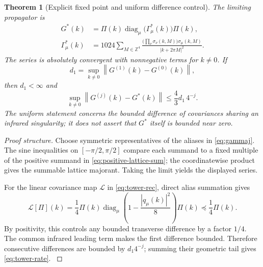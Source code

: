 \documentclass[11pt,oneside,openany]{book}
\newtheorem{theorem}{Theorem}[chapter]
\theoremstyle{definition}
\theoremstyle{remark}
\newcommand{\Z}{\mathbb Z}
\newcommand{\diag}{\operatorname{diag}}
\newcommand{\norm}[1]{\left\lVert#1\right\rVert}
\newcommand{\src}[2]{\cite[#2]{#1}}
\begin{document}
\begin{theorem}[Explicit fixed point and uniform difference control]\label{thm:tower-fixed}
The limiting propagator is
\begin{align}
G^*(k)&=\Pi(k)\diag_\mu\bigl(\Gamma_\mu^*(k)\bigr)\Pi(k),\label{eq:Gstar}\\
\Gamma_\mu^*(k)&=1024\sum_{M\in\Z^4}
\frac{\bigl(\prod_\nu\sigma_\nu(k,M)\bigr)\sigma_\mu(k,M)}
{|k+2\pi M|^2}.
\label{eq:positive-lattice-sum}
\end{align}
The series is absolutely convergent with nonnegative terms for $k\ne0$. If
\[
d_1=\sup_{k\ne0}\norm{G^{(1)}(k)-G^{(0)}(k)},
\]
then $d_1<\infty$ and
\begin{equation}\label{eq:tower-rate}
\sup_{k\ne0}\norm{G^{(j)}(k)-G^*(k)}
\le\frac43d_1\,4^{-j}.
\end{equation}
The uniform statement concerns the bounded difference of covariances sharing an infrared singularity; it does not assert that $G^*$ itself is bounded near zero.
\end{theorem}
\begin{proof}[Proof structure]
Choose symmetric representatives of the aliases in \cref{eq:gammaj}. The sine inequalities on $[-\pi/2,\pi/2]$ compare each summand to a fixed multiple of the positive summand in \cref{eq:positive-lattice-sum}; the coordinatewise product gives the summable lattice majorant. Taking the limit yields the displayed series.

For the linear covariance map $\mathcal L$ in \cref{eq:tower-rec}, direct alias summation gives
\begin{equation}\label{eq:Lcontraction}
\mathcal L[\Pi](k)=\frac14\Pi(k)
\diag_\mu\left(1-\frac{|q_\mu(k)|^2}{8}\right)\Pi(k)
\preceq\frac14\Pi(k).
\end{equation}
By positivity, this controls any bounded transverse difference by a factor $1/4$. The common infrared leading term makes the first difference bounded. Therefore consecutive differences are bounded by $d_1 4^{-j}$; summing their geometric tail gives \cref{eq:tower-rate}. \src{F11}{V35, V37}
\end{proof}
\end{document}
